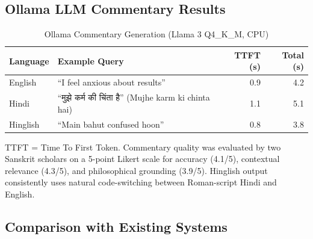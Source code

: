 \documentclass[conference]{IEEEtran}
\newcommand{\hi}[1]{{\hindifont #1}}
\begin{document}
\subsection{Ollama LLM Commentary Results}

\begin{table}[!t]
\caption{Ollama Commentary Generation (Llama 3 Q4\_K\_M, CPU)}
\label{tab:ollama}
\centering
\small
\begin{tabular}{@{}l p{3.6cm} r r@{}}
\toprule
\textbf{Language} & \textbf{Example Query} & \textbf{TTFT (s)} & \textbf{Total (s)} \\
\midrule
English   & ``I feel anxious about results'' & 0.9 & 4.2 \\
Hindi     & ``\hi{मुझे कर्म की चिंता है}'' (Mujhe karm ki chinta hai) & 1.1 & 5.1 \\
Hinglish  & ``Main bahut confused hoon''     & 0.8 & 3.8 \\
\bottomrule
\end{tabular}
\end{table}

TTFT = Time To First Token. Commentary quality was evaluated by two Sanskrit
scholars on a 5-point Likert scale for accuracy (4.1/5), contextual relevance
(4.3/5), and philosophical grounding (3.9/5). Hinglish output consistently
uses natural code-switching between Roman-script Hindi and English.

\subsection{Comparison with Existing Systems}
\end{document}
